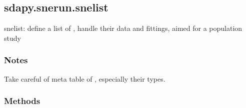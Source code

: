 \documentclass[letterpaper,10pt,english]{sphinxmanual}
\begin{document}
\subsection{sdapy.snerun.snelist}
\label{\detokenize{generated/sdapy.snerun.snelist:sdapy-snerun-snelist}}\label{\detokenize{generated/sdapy.snerun.snelist::doc}}

\begin{fulllineitems}
\label{\detokenize{generated/sdapy.snerun.snelist:sdapy.snerun.snelist}}
snelist: define a list of , handle their data and fittings, aimed for a population study



\begin{description}
\item[{{\hyperref[\detokenize{generated/sdapy.snerun.snobject:sdapy.snerun.snobject}]{}}}] \leavevmode
\end{description}


\subsubsection*{Notes}

Take careful of meta table of , especially their types.
\subsubsection*{Methods}


\begin{savenotes}\sphinxatlongtablestart\begin{longtable}[c]{}
\hline

\endfirsthead

%
{}\\
\hline

\endhead

\hline
{}\\
\endfoot


\end{longtable}
\end{savenotes}
\end{fulllineitems}
\end{document}
